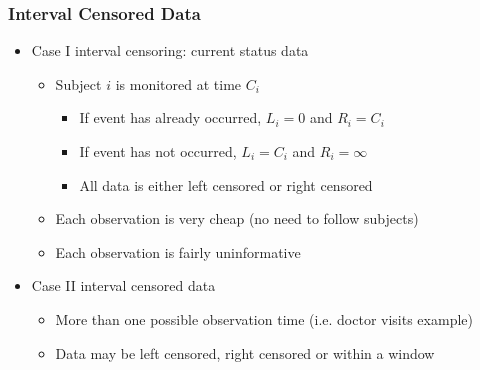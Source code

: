 \documentclass[compress,red]{beamer}
\begin{document}
\begin{frame}

\frametitle{Interval Censored Data}

	\begin{itemize}

	\item Case I interval censoring: current status data
	
		\begin{itemize}
		
		\item Subject $i$ is monitored at time $C_i$
			
			\begin{itemize}
			
			\item If event has already occurred, $L_i = 0$ and $R_i = C_i$
			
			\item If event has not occurred, $L_i = C_i$ and $R_i = \infty$
		
			\item All data is either left censored or right censored
			
			\end{itemize}
		
		\item Each observation is very cheap (no need to follow subjects)
		
		\item Each observation is fairly uninformative 
		
		\end{itemize}
	
	\item Case II interval censored data
	
		\begin{itemize}
		
		\item More than one possible observation time (i.e. doctor visits example)
		
		\item Data may be left censored, right censored or within a window
				
		\end{itemize}
	
	\end{itemize}

\end{frame}
\end{document}
